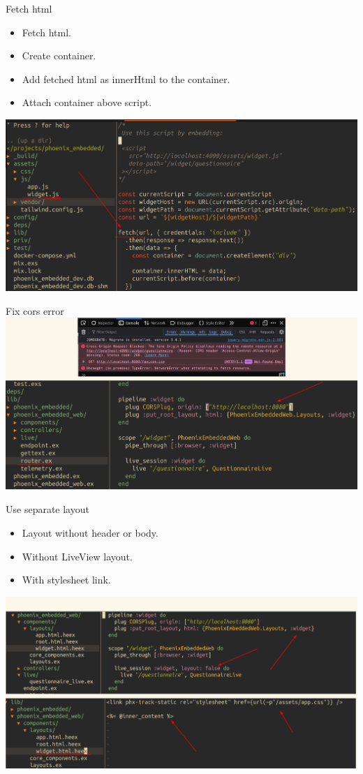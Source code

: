 \documentclass{beamer}
\begin{document}
\begin{frame}{Fetch html}

  \begin{itemize}
    \item Fetch html.
    \item Create container.
    \item Add fetched html as innerHtml to the container.
    \item Attach container above script.
  \end{itemize}
  \centering
  \includegraphics[width=0.8\linewidth]{images/fetch-html.png}
\end{frame}

\begin{frame}{Fix cors error}
  \centering
  \includegraphics[width=0.8\linewidth]{images/cors.png}
\end{frame}

\begin{frame}{Use separate layout}
\begin{itemize}
  \item Layout without header or body.
  \item Without LiveView layout.
  \item With stylesheet link.
\end{itemize}
\centering
\includegraphics[width=0.8\linewidth]{images/layout.png}
\end{frame}
\end{document}
